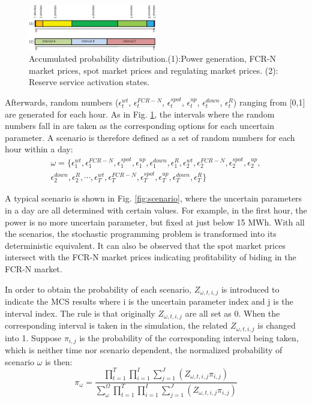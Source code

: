 \documentclass[final,5p,times,twocolumn,authoryear]{elsarticle}
\begin{document}
\begin{figure}[h]
    \centering
    \includegraphics[width=0.5\textwidth]{figures/MCS.eps}
    \caption{Accumulated probability distribution.(1):Power generation, FCR-N market prices, spot market prices and regulating market prices. (2): Reserve service activation states.}
    \label{fig:mcs}
\end{figure}
Afterwards, random numbers ($\epsilon_t^{wt}$, $\epsilon_t^{FCR-N}$, $\epsilon_t^{spot}$, $\epsilon_t^{up}$,
$\epsilon_t^{down}$,
$\epsilon_t^R$) ranging from [0,1] are generated for each hour. As in Fig. \ref{fig:mcs}, the intervals where the random numbers fall in are taken as the corresponding options for each uncertain parameter. A scenario is therefore defined as a set of random numbers for each hour within a day:
\begin{equation} \label{eq:scenario}
\begin{split}
 \omega= \{\epsilon_1^{wt}, \epsilon_1^{FCR-N}, \epsilon_1^{spot},\epsilon_1^{up},\epsilon_1^{down}, \epsilon_1^R,\epsilon_2^{wt}, \epsilon_2^{FCR-N},\epsilon_2^{spot},\epsilon_2^{up},\\ \epsilon_2^{down}, \epsilon_2^R,\cdots,\epsilon_T^{wt}, \epsilon_T^{FCR-N}, \epsilon_T^{spot}, \epsilon_T^{up},\epsilon_T^{down},\epsilon_T^R \}
\end{split}
\end{equation}

A typical scenario is shown in Fig. \ref{fig:scenario}, where the uncertain parameters in a day are all determined with certain values. For example, in the first hour, the power is no more uncertain parameter, but fixed at just below 15 MWh. With all the scenarios, the stochastic programming problem is transformed into its deterministic equivalent. It can also be observed that the spot market prices intersect with the FCR-N market prices indicating profitability of biding in the FCR-N market.

In order to obtain the probability of each scenario, $Z_{\omega,t,i,j}$ is introduced to indicate the MCS results where i is the uncertain parameter index and j is the interval index. The rule is that originally $Z_{\omega,t,i,j}$ are all set as 0. When the corresponding interval is taken in the simulation, the related $Z_{\omega,t,i,j}$ is changed into 1. Suppose $\pi_{i,j}$ is the probability of the corresponding interval being taken, which is neither time nor scenario dependent, the normalized probability \cite{Niknam2012AnOperation} of scenario $\omega$ is then:
\begin{equation} \label{eq:scenarioProbability}
\pi_{\omega} = \frac{\prod_{t=1}^T \prod_{i=1}^I\sum_{j=1}^J(Z_{\omega,t,i,j}\pi_{i,j})}{\sum_{\omega}^{\Omega}\prod_{t=1}^T \prod_{i=1}^I\sum_{j=1}^J(Z_{\omega,t,i,j}\pi_{i,j})}
\end{equation}
\end{document}
